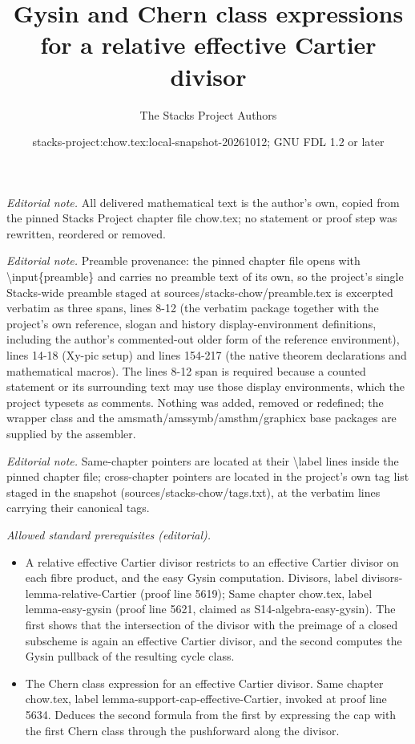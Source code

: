 \documentclass[10pt,a4paper]{amsart}
\title{Gysin and Chern class expressions for a relative effective Cartier divisor}
\author{The Stacks Project Authors}
\date{stacks-project:chow.tex:local-snapshot-20261012; GNU FDL 1.2 or later}
\theoremstyle{plain}
\theoremstyle{definition}
\theoremstyle{remark}
\numberwithin{equation}{subsection}
\begin{document}
\maketitle
\noindent\textit{Editorial note.} All delivered mathematical text is the author's own, copied from the pinned Stacks Project chapter file chow.tex; no statement or proof step was rewritten, reordered or removed.\par\medskip
\noindent\textit{Editorial note.} Preamble provenance: the pinned chapter file opens with \textbackslash{}input\{preamble\} and carries no preamble text of its own, so the project's single Stacks-wide preamble staged at sources/stacks-chow/preamble.tex is excerpted verbatim as three spans, lines 8-12 (the verbatim package together with the project's own reference, slogan and history display-environment definitions, including the author's commented-out older form of the reference environment), lines 14-18 (Xy-pic setup) and lines 154-217 (the native theorem declarations and mathematical macros). The lines 8-12 span is required because a counted statement or its surrounding text may use those display environments, which the project typesets as comments. Nothing was added, removed or redefined; the wrapper class and the amsmath/amssymb/amsthm/graphicx base packages are supplied by the assembler.\par\medskip
\noindent\textit{Editorial note.} Same-chapter pointers are located at their \textbackslash{}label lines inside the pinned chapter file; cross-chapter pointers are located in the project's own tag list staged in the snapshot (sources/stacks-chow/tags.txt), at the verbatim lines carrying their canonical tags.\par\medskip
\noindent\textit{Allowed standard prerequisites (editorial).}\begin{itemize}
\item A relative effective Cartier divisor restricts to an effective Cartier divisor on each fibre product, and the easy Gysin computation. Divisors, label divisors-lemma-relative-Cartier (proof line 5619); Same chapter chow.tex, label lemma-easy-gysin (proof line 5621, claimed as S14-algebra-easy-gysin). The first shows that the intersection of the divisor with the preimage of a closed subscheme is again an effective Cartier divisor, and the second computes the Gysin pullback of the resulting cycle class.
\item The Chern class expression for an effective Cartier divisor. Same chapter chow.tex, label lemma-support-cap-effective-Cartier, invoked at proof line 5634. Deduces the second formula from the first by expressing the cap with the first Chern class through the pushforward along the divisor.
\end{itemize}\medskip
\end{document}
